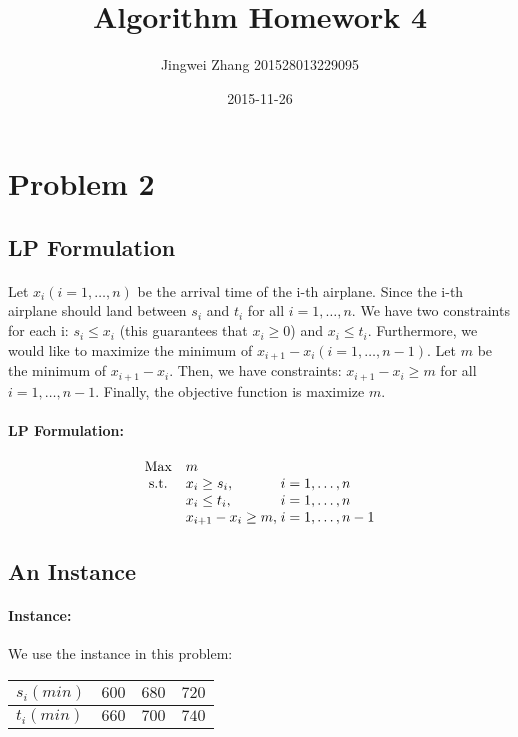 \documentclass[]{article}
\title{Algorithm Homework 4}
\date{2015-11-26}
\author{Jingwei Zhang 201528013229095}
\begin{document}
    \maketitle
    \section{Problem 2}
        \subsection{LP Formulation}
        \paragraph{}Let $x_i(i=1,\dots,n)$ be the arrival time of the  i-th airplane. Since the i-th airplane should land between $s_i$ and $t_i$ for all $i=1,\dots,n$. We have two constraints for each i: $s_i \leq x_i$ (this guarantees that $x_i \geq 0$) and $x_i \leq t_i$. Furthermore, we would like to maximize the minimum of $x_{i+1} - x_i(i = 1,\dots,n-1)$. Let $m$ be the minimum of $x_{i+1} - x_i$. Then, we have constraints: $x_{i+1} - x_i \geq m$ for all $i = 1,\dots,n-1$. Finally, the objective function is maximize $m$. 
        \paragraph{LP Formulation:} 
        \begin{equation*}
\begin{array}{cl@{}ll}
\text{Max}  & m &\\
\text{s.t.} & x_i \geq s_i,\;  & i=1,\dots,n  \\
            & x_i \leq t_i,\;  & i=1,\dots,n  \\
            & x_{i+1} - x_i \geq m,\; & i = 1,\dots,n-1 \\
            
\end{array}
        \end{equation*}
        \subsection{An Instance}
        \paragraph{Instance:}We use the instance in this problem:  
\begin{table}[h!]
            \centering            
            \begin{tabular}{l|*{3}{c}}
            \hline
$s_i(min)$ & $600$ & $680$ & $720$ \\
\hline
$t_i(min)$ & $660$ & $700$ & $740$ \\
            \hline            
            \end{tabular}
\end{table}
\end{document}
